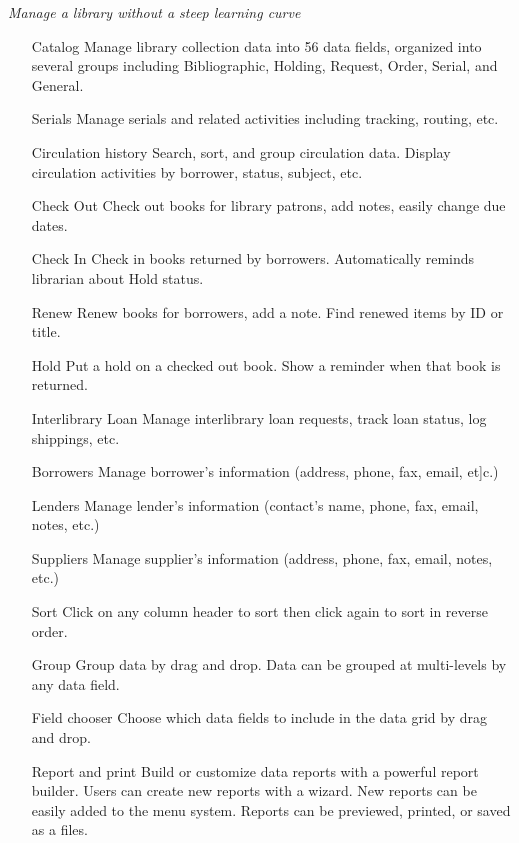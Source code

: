 \textit{Manage a library without a steep learning curve}
\begin{itemize}
 \item[Catalog] Manage library collection data into 56 data fields,
 organized into several groups including Bibliographic, Holding,
 Request, Order, Serial, and General.

 \item[Serials] Manage serials and related activities including tracking,
 routing, etc. 

 \item[Circulation history] Search, sort, and group circulation data.
 Display circulation activities by borrower, status, subject, etc. 

 \item[Check Out] Check out books for library patrons, add notes, easily
 change due dates.

 \item[Check In] Check in books returned by borrowers. Automatically
 reminds librarian about Hold status.

 \item[Renew] Renew books for borrowers, add a note. Find renewed
 items by ID or title.

 \item[Hold] Put a hold on a checked out book. Show a reminder when
 that book is returned.

 \item[Interlibrary Loan] Manage interlibrary loan requests, track loan
 status, log shippings, etc.

 \item[Borrowers] Manage borrower's information (address, phone, fax,
 email, et]c.)

 \item[Lenders] Manage lender's information (contact's name, phone, fax,
 email, notes, etc.)

 \item[Suppliers] Manage supplier's information (address, phone, fax,
 email, notes, etc.)

 \item[Sort] Click on any column header to sort then click again to sort in
 reverse order.

 \item[Group] Group data by drag and drop. Data can be grouped at
 multi-levels by any data field.

 \item[Field chooser] Choose which data fields to include in the data grid
 by drag and drop.

 \item[Report and print] Build or customize data reports with a powerful
 report builder. Users can create new reports with a wizard. New
 reports can be easily added to the menu system. Reports can be
 previewed, printed, or saved as a files.


\end{itemize}

